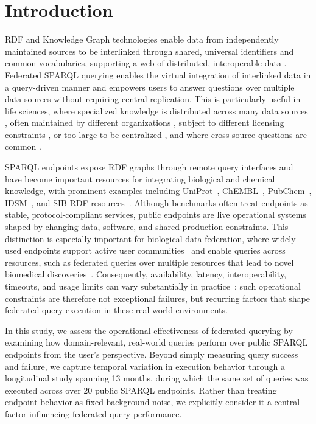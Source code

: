 \documentclass[runningheads]{llncs}
\begin{document}
\section{Introduction}\label{sec1}
RDF and Knowledge Graph technologies enable data from independently maintained sources to be interlinked through shared, universal identifiers and common vocabularies, supporting a web of distributed, interoperable data \cite{hogan2021knowledge}.
Federated SPARQL querying enables the virtual integration of interlinked data in a query-driven manner and empowers users to answer questions over multiple data sources without requiring central replication. 
This is particularly useful in life sciences, where specialized knowledge is distributed across many data sources \cite{hasnain2017biofed}, often maintained by different organizations \cite{khan2017safe}, subject to different licensing constraints \cite{Moreau2021}, or too large to be centralized \cite{lubiana2025split}, and where cross-source questions are common \cite{Morgat2020Rhea}. 

SPARQL endpoints expose RDF graphs through remote query interfaces and have become important resources for integrating biological and chemical knowledge, with prominent examples including UniProt~\cite{uniprot2025}, ChEMBL~\cite{Willighagen2013ChEMBL}, PubChem~\cite{Fu2015PubChemRDF}, IDSM~\cite{Galgonek2021ChemWebRDF}, and SIB RDF resources~\cite{sib2024semanticweb}. 
Although benchmarks often treat endpoints as stable, protocol-compliant services, public endpoints are live operational systems shaped by changing data, software, and shared production constraints. 
This distinction is especially important for biological data federation, where widely used endpoints support active user communities~\cite{uniprot2025} and enable queries across resources, such as federated queries over multiple resources that lead to novel biomedical discoveries~\cite{Morgat2020Rhea}. 
Consequently, availability, latency, interoperability, timeouts, and usage limits can vary substantially in practice~\cite{Vandenbussche2017SPARQLES}; such operational constraints are therefore not exceptional failures, but recurring factors that shape federated query execution in these real-world environments.

In this study, we assess the operational effectiveness of federated querying by examining how domain-relevant, real-world queries perform over public SPARQL endpoints from the user’s perspective. 
Beyond simply measuring query success and failure, we capture temporal variation in execution behavior through a longitudinal study spanning 13 months, during which the same set of queries was executed across over 20 public SPARQL endpoints. 
Rather than treating endpoint behavior as fixed background noise, we explicitly consider it a central factor influencing federated query performance.
\end{document}
